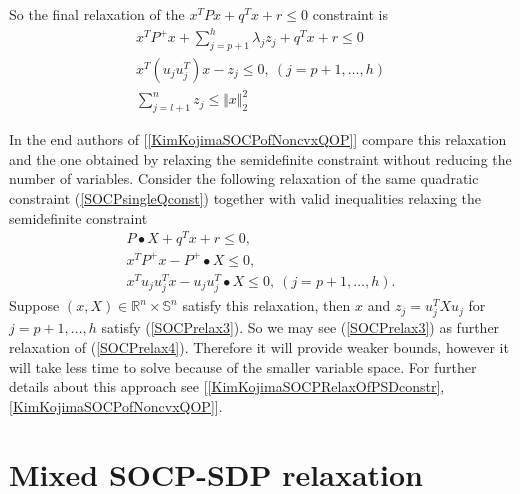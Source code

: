 \documentclass[12pt]{book}
\theoremstyle{definition}
\begin{document}
So the final relaxation of the  $x^TPx + q^Tx + r \leq 0$ constraint is
\begin{equation}
\begin{array}{l}
\label{SOCPrelax3}
x^TP^+x + \sum_{j = p + 1}^h \lambda_j z_j + q^Tx + r \leq 0 \\
x^T(u_ju_j^T)x - z_j \leq 0, \ ( j= p+1, \dots ,h) \\
\sum_{j=l+1}^n z_j \leq \Vert x\Vert_2^2
\end{array}
\end{equation}

In the end authors of [\ref{KimKojimaSOCPofNoncvxQOP}] compare this relaxation and the one obtained by relaxing the semidefinite constraint without reducing the number of variables.  Consider the following relaxation of the same quadratic constraint (\ref{SOCPsingleQconst})
together with valid inequalities relaxing the semidefinite constraint
\begin{equation}
\begin{array}{l}
\label{SOCPrelax4}
P\bullet X + q^Tx + r \leq 0,\\
x^TP^+x - P^+\bullet X \leq 0, \\
x^Tu_ju_j^Tx - u_ju_j^T\bullet X \leq 0, \ (j = p+1,\dots ,h).
\end{array}
\end{equation}
Suppose $(x,X) \in \mathbb{R}^n\times \mathbb{S}^n$ satisfy this relaxation, then $x$ and $z_j = u_j^TXu_j$ for $j = p+1,\dots ,h$ satisfy (\ref{SOCPrelax3}). So we may see (\ref{SOCPrelax3}) as further relaxation of (\ref{SOCPrelax4}).
Therefore it will provide weaker bounds, however it will take less time to solve because of the smaller variable space.  
For further details about this approach see  [\ref{KimKojimaSOCPRelaxOfPSDconstr}, \ref{KimKojimaSOCPofNoncvxQOP}].



\section{Mixed SOCP-SDP relaxation}
\end{document}
